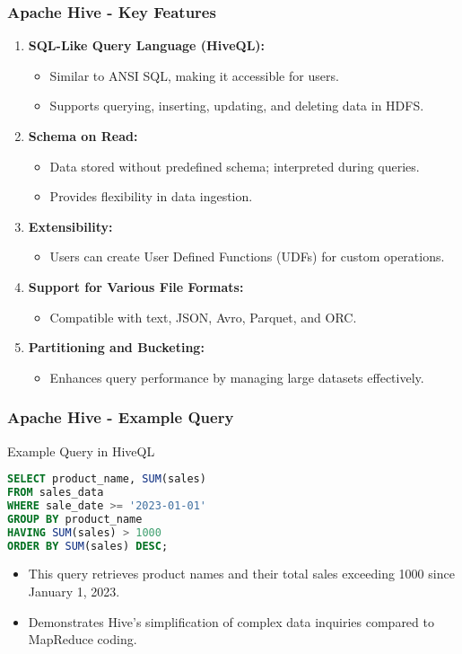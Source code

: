 \documentclass[aspectratio=169]{beamer}
\begin{document}
\begin{frame}[fragile]
    \frametitle{Apache Hive - Key Features}
    \begin{enumerate}
        \item \textbf{SQL-Like Query Language (HiveQL):}
            \begin{itemize}
                \item Similar to ANSI SQL, making it accessible for users.
                \item Supports querying, inserting, updating, and deleting data in HDFS.
            \end{itemize}
        \item \textbf{Schema on Read:}
            \begin{itemize}
                \item Data stored without predefined schema; interpreted during queries.
                \item Provides flexibility in data ingestion.
            \end{itemize}
        \item \textbf{Extensibility:}
            \begin{itemize}
                \item Users can create User Defined Functions (UDFs) for custom operations.
            \end{itemize}
        \item \textbf{Support for Various File Formats:}
            \begin{itemize}
                \item Compatible with text, JSON, Avro, Parquet, and ORC.
            \end{itemize}
        \item \textbf{Partitioning and Bucketing:}
            \begin{itemize}
                \item Enhances query performance by managing large datasets effectively.
            \end{itemize}
    \end{enumerate}
\end{frame}

\begin{frame}[fragile]
    \frametitle{Apache Hive - Example Query}
    \begin{block}{Example Query in HiveQL}
        \begin{lstlisting}[language=SQL]
SELECT product_name, SUM(sales)
FROM sales_data
WHERE sale_date >= '2023-01-01'
GROUP BY product_name
HAVING SUM(sales) > 1000
ORDER BY SUM(sales) DESC;
        \end{lstlisting}
    \end{block}
    \begin{itemize}
        \item This query retrieves product names and their total sales exceeding 1000 since January 1, 2023.
        \item Demonstrates Hive's simplification of complex data inquiries compared to MapReduce coding.
    \end{itemize}
\end{frame}
\end{document}
